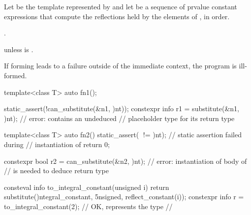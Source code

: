\begin{itemdescr}
\pnum
Let  be the template represented by 
and let  be a sequence of prvalue constant expressions
that compute the reflections held by the elements of ,
in order.

\pnum
\returns
{}.

\pnum
\throws
{} unless
 is .

\pnum
\begin{note}
If forming  leads to a failure outside of the immediate context,
the program is ill-formed.
\end{note}

\pnum
\begin{example}
\begin{codeblock}
template<class T>
  auto fn1();

static_assert(!can_substitute(^^fn1, {^^int}));
constexpr info r1 = substitute(^^fn1, {^^int});         // error:  contains an undeduced
                                                        // placeholder type for its return type

template<class T>
  auto fn2() {
    static_assert(^^T != ^^int);                        // static assertion failed during
                                                        // instantiation of 
    return 0;
  }

constexpr bool r2 = can_substitute(^^fn2, {^^int});     // error: instantiation of body of 
                                                        // is needed to deduce return type
\end{codeblock}
\end{example}

\pnum
\begin{example}
\begin{codeblock}
consteval info to_integral_constant(unsigned i) {
  return substitute(^^integral_constant, {^^unsigned, reflect_constant(i)});
}
constexpr info r = to_integral_constant(2);             // OK,  represents the type
                                                        // 
\end{codeblock}
\end{example}
\end{itemdescr}

